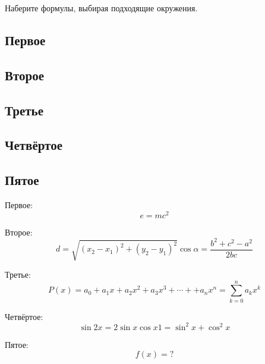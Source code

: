 \begin{staticpart}
Наберите формулы, выбирая подходящие окружения.
\subsection{Первое}

\subsection{Второе}

\subsection{Третье}

\subsection{Четвёртое}

\subsection{Пятое}
\htmlblockquote{
\[
    f(x) = \begin{cases}
        \sin x,  & \text{если } x \geqslant 0,\\
        x^2 + 1, & \text{если } x < 0.
    \end{cases}
\]
}

\end{staticpart}

Первое:
\[
    e=mc^2
\]

\par Второе:
\[
    d = \sqrt{ (x_2 - x_1)^2 + (y_2 - y_1)^2 }
    \cos \alpha = \frac{b^2 + c^2 - a^2}{2bc}
\]

\par Третье:
\[
    P(x) = a_0 + a_1 x + a_2 x^2 + a_3 x^3 + \cdots +
    + a_n x^n = \sum_{k=0}^n a_k x^k
\]

\par Четвёртое:
\[
    \sin 2x = 2 \sin x \cos x
    1 = \sin ^2 x + \cos ^2 x
\]

\par Пятое:
\[
    f(x) = ?
\]
